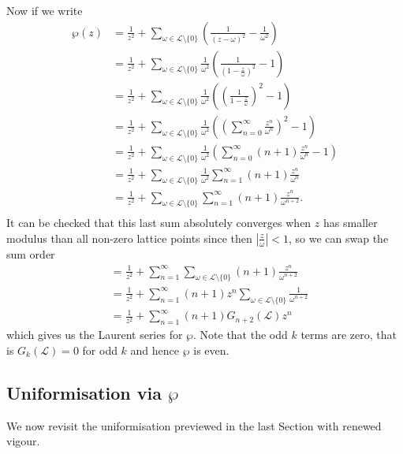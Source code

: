\documentclass{article}
\theoremstyle{definition}
\theoremstyle{definition}
\theoremstyle{definition}
\begin{document}
Now if we write
\begin{align*}
    \wp(z)&=\frac{1}{z^2}+\sum_{\omega\in\mathcal{L}\setminus\{0\}}\left(\frac{1}{(z-\omega)^2}-\frac{1}{\omega^2}\right)\\
    &=\frac{1}{z^2}+\sum_{\omega\in\mathcal{L}\setminus\{0\}}\frac{1}{\omega^2}\left(\frac{1}{(1-\frac{z}{\omega})^2}-1\right)\\
    &=\frac{1}{z^2}+\sum_{\omega\in\mathcal{L}\setminus\{0\}}\frac{1}{\omega^2}\left(\left(\frac{1}{1-\frac{z}{\omega}}\right)^2-1\right)\\
    &=\frac{1}{z^2}+\sum_{\omega\in\mathcal{L}\setminus\{0\}}\frac{1}{\omega^2}\left(\left(\sum_{n=0}^\infty\frac{z^n}{\omega^n}\right)^2-1\right)\\
    &=\frac{1}{z^2}+\sum_{\omega\in\mathcal{L}\setminus\{0\}}\frac{1}{\omega^2}\left(\sum_{n=0}^\infty(n+1)\frac{z^n}{\omega^n}-1\right)\\
    &=\frac{1}{z^2}+\sum_{\omega\in\mathcal{L}\setminus\{0\}}\frac{1}{\omega^2}\sum_{n=1}^\infty(n+1)\frac{z^n}{\omega^n}\\
    &=\frac{1}{z^2}+\sum_{\omega\in\mathcal{L}\setminus\{0\}}\sum_{n=1}^\infty(n+1)\frac{z^n}{\omega^{n+2}}.\\
\end{align*}
It can be checked that this last sum absolutely converges when $z$ has smaller modulus than all non-zero lattice points since then $\left|\frac{z}{\omega}\right|<1$, so we can swap the sum order
\begin{align*}
    &=\frac{1}{z^2}+\sum_{n=1}^\infty\sum_{\omega\in\mathcal{L}\setminus\{0\}}(n+1)\frac{z^n}{\omega^{n+2}}\\
    &=\frac{1}{z^2}+\sum_{n=1}^\infty(n+1)z^n\sum_{\omega\in\mathcal{L}\setminus\{0\}}\frac{1}{\omega^{n+2}}\\
    &=\frac{1}{z^2}+\sum_{n=1}^\infty(n+1)G_{n+2}(\mathcal L)z^n
\end{align*}
which gives us the Laurent series for $\wp$. Note that the odd $k$ terms are zero,  that is $G_{k}(\mathcal L)=0$ for odd $k$ and hence $\wp$ is even.

\subsection{Uniformisation via $\wp$}

We now revisit the uniformisation previewed in the last Section with renewed vigour.
\end{document}
